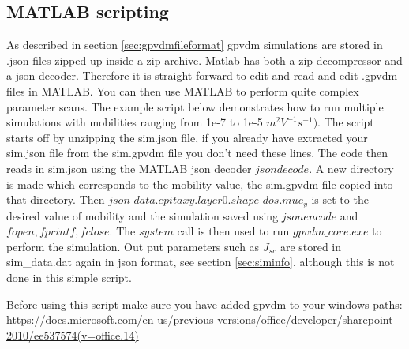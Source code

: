 \newpage
\subsection{MATLAB scripting}
\label{sec:matlabscripts}
As described in section \ref{sec:gpvdmfileformat} gpvdm simulations are stored in .json files zipped up inside a zip archive. Matlab has both a zip decompressor and a json decoder.  Therefore it is straight forward to edit and read and edit .gpvdm files in MATLAB. You can then use MATLAB to perform quite complex parameter scans.  The example script below demonstrates how to run multiple simulations with mobilities ranging from 1e-7 to 1e-5 $m^{2}V^{-1}s^{-1})$. The script starts off by unzipping the sim.json file, if you already have extracted your sim.json file from the sim.gpvdm file you don't need these lines. The code then reads in sim.json using the MATLAB json decoder $jsondecode$. A new directory is made which corresponds to the mobility value, the sim.gpvdm file copied into that directory. Then $json\_data.epitaxy.layer0.shape\_dos.mue_y$ is set to the desired value of mobility and the simulation saved using $jsonencode$ and $fopen,fprintf,fclose$.  The $system$ call is then used to run $gpvdm\_core.exe$ to perform the simulation. Out put parameters such as $J_{sc}$ are stored in sim\_data.dat again in json format, see section \ref{sec:siminfo}, although this is not done in this simple script.

Before using this script make sure you have added gpvdm to your windows paths:
\url{https://docs.microsoft.com/en-us/previous-versions/office/developer/sharepoint-2010/ee537574(v=office.14)}


